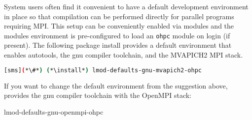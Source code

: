 System users often find it convenient to have a default development environment
in place so that compilation can be performed directly for parallel programs
requiring MPI. This setup can be conveniently enabled via modules and the \OHPC{}
modules environment is pre-configured to load an \texttt{ohpc} module on login
(if present). The following package install provides a default
environment that enables autotools, the gnu compiler toolchain, and the
MVAPICH2 MPI stack.

\begin{lstlisting}[language=bash]
[sms](*\#*) (*\install*) lmod-defaults-gnu-mvapich2-ohpc
\end{lstlisting}

\begin{center}
\begin{tcolorbox}[]
\small
If you want to change the default environment from the suggestion above, \OHPC{}
provides the gnu compiler toolchain with the OpenMPI stack:
\begin{itemize*}
\item lmod-defaults-gnu-openmpi-ohpc
\end{itemize*}
\end{tcolorbox}
\end{center}
